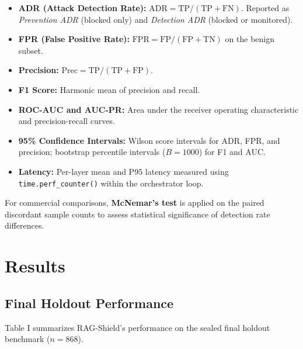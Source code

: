 \documentclass[conference]{IEEEtran}
\begin{document}
\begin{itemize}
\item \textbf{ADR (Attack Detection Rate):} $\text{ADR} = \text{TP} / (\text{TP} + \text{FN})$. Reported as \emph{Prevention ADR} (blocked only) and \emph{Detection ADR} (blocked or monitored).
\item \textbf{FPR (False Positive Rate):} $\text{FPR} = \text{FP} / (\text{FP} + \text{TN})$ on the benign subset.
\item \textbf{Precision:} $\text{Prec} = \text{TP} / (\text{TP} + \text{FP})$.
\item \textbf{F1 Score:} Harmonic mean of precision and recall.
\item \textbf{ROC-AUC and AUC-PR:} Area under the receiver operating characteristic and precision-recall curves.
\item \textbf{95\% Confidence Intervals:} Wilson score intervals for ADR, FPR, and precision; bootstrap percentile intervals ($B = 1000$) for F1 and AUC.
\item \textbf{Latency:} Per-layer mean and P95 latency measured using \texttt{time.perf\_counter()} within the orchestrator loop.
\end{itemize}

For commercial comparisons, \textbf{McNemar's test} is applied on the paired discordant sample counts to assess statistical significance of detection rate differences.



\section{Results}

\subsection{Final Holdout Performance}

Table I summarizes RAG-Shield's performance on the sealed final holdout benchmark ($n = 868$).
\end{document}
